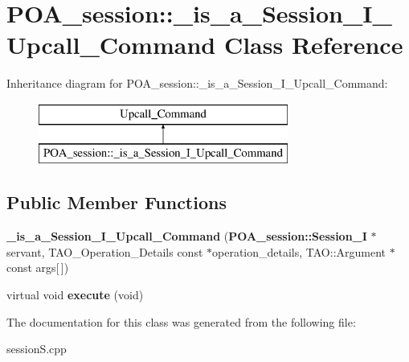 \section{P\+O\+A\+\_\+session\+:\+:\+\_\+is\+\_\+a\+\_\+\+Session\+\_\+\+I\+\_\+\+Upcall\+\_\+\+Command Class Reference}
\label{classPOA__session_1_1__is__a__Session__I__Upcall__Command}
Inheritance diagram for P\+O\+A\+\_\+session\+:\+:\+\_\+is\+\_\+a\+\_\+\+Session\+\_\+\+I\+\_\+\+Upcall\+\_\+\+Command\+:\begin{figure}[H]
\begin{center}
\leavevmode
\includegraphics[height=2.000000cm]{classPOA__session_1_1__is__a__Session__I__Upcall__Command}
\end{center}
\end{figure}
\subsection*{Public Member Functions}
\begin{DoxyCompactItemize}
\item 
{\bfseries \+\_\+is\+\_\+a\+\_\+\+Session\+\_\+\+I\+\_\+\+Upcall\+\_\+\+Command} ({\bf P\+O\+A\+\_\+session\+::\+Session\+\_\+I} $\ast$servant, T\+A\+O\+\_\+\+Operation\+\_\+\+Details const $\ast$operation\+\_\+details, T\+A\+O\+::\+Argument $\ast$const args[$\,$])\label{classPOA__session_1_1__is__a__Session__I__Upcall__Command_a6bc9d3eb1abbad758da99e3cbfed46e6}

\item 
virtual void {\bfseries execute} (void)\label{classPOA__session_1_1__is__a__Session__I__Upcall__Command_af82f0e33d8ad3b37c07bc875cd4c441e}

\end{DoxyCompactItemize}


The documentation for this class was generated from the following file\+:\begin{DoxyCompactItemize}
\item 
session\+S.\+cpp\end{DoxyCompactItemize}
